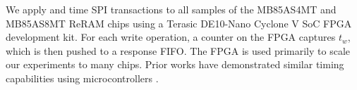 We apply and time SPI transactions to all samples of the MB85AS4MT and MB85AS8MT ReRAM chips using a Terasic DE10-Nano Cyclone V SoC FPGA development kit. For each write operation, a counter on the FPGA captures $t_w$, which is then pushed to a response FIFO. The FPGA is used primarily to scale our experiments to many chips. Prior works have demonstrated similar timing capabilities using microcontrollers \cite{tolga2024trng, ferdaus2024hiding}.



